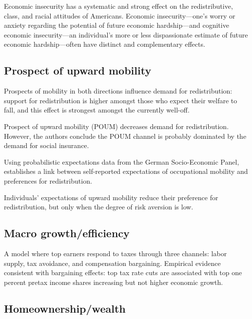 \documentclass{article}
\newcommand{\citem}[1]{\medskip \noindent \textbf{\cite*{#1}}}
\begin{document}
\citem{melcher2023economic}

Economic insecurity has a systematic and strong effect on the redistributive, class, and racial attitudes of Americans. Economic insecurity—one’s worry or anxiety regarding the potential of future economic hardship—and cognitive economic insecurity—an individual’s more or less dispassionate estimate of future economic hardship—often have distinct and complementary effects.

\subsection{Prospect of upward mobility}

\citem{ravallion2000wants}

Prospects of mobility in both directions influence demand for
redistribution: support for redistribution is higher amongst those who expect their welfare to fall, and this effect is strongest amongst the currently well-off.

\citem{benabou2001social}

Prospect of upward mobility (POUM) decreases demand for redistribution. However, the authors conclude the POUM channel is probably dominated by the demand for social insurance.

\citem{rainer2008subjective}

Using probabilistic expectations data from the German Socio-Economic Panel, establishes a link between self-reported expectations of
occupational mobility and preferences for redistribution.

\citem{cojocaru2014prospects}

Individuals' expectations of upward mobility reduce their preference for redistribution, but only when the degree of risk aversion is low. 

\subsection{Macro growth/efficiency}

\citem{piketty2014optimal}

A model where top earners respond to taxes through three channels: labor supply, tax avoidance, and compensation bargaining. Empirical evidence consistent with bargaining effects: top tax rate cuts are associated with top one percent pretax income shares increasing but not higher economic growth.

\subsection{Homeownership/wealth}
\end{document}
